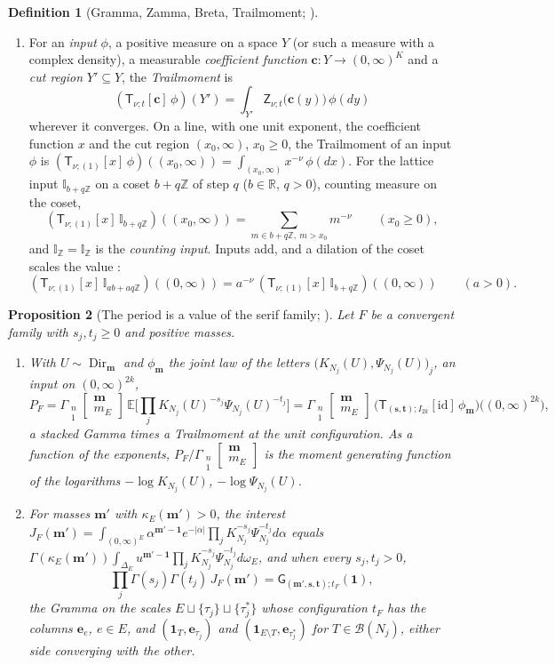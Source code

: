 \documentclass[11pt]{article}
\theoremstyle{plain}
\newtheorem{prop}{Proposition}[section]
\theoremstyle{definition}
\newtheorem{defn}[prop]{Definition}
\theoremstyle{remark}
\newcommand{\cB}{\mathcal B}
\newcommand{\R}{\mathbb R}
\newcommand{\Z}{\mathbb Z}
\newcommand{\bm}{\mathbf m}
\newcommand{\sG}{\mathsf G}
\newcommand{\sZ}{\mathsf Z}
\newcommand{\sT}{\mathsf T}
\newcommand{\Gst}[4]{\Gamma_{\substack{#1\\#2}}\!\begin{bmatrix}#3\\#4\end{bmatrix}}
\newcommand{\IZ}{\mathbb I_{\mathbb Z}}
\newcommand{\Ilat}[1]{\mathbb I_{#1}}
\newcommand{\Tx}[3]{(\sT_{#1;(1)}[x]\,#2)((#3,\infty))}
\DeclareMathOperator{\Dir}{Dir}
\begin{document}
\begin{defn}[Gramma, Zamma, Breta, Trailmoment; {\cite[Defs.~2.1, 2.12, 3.1, 5.1, 5.2, pp.~13--28]{F}}]
\begin{enumerate}[label=(\roman*)]
\[\]
\item For an \emph{input} $\phi$, a positive measure on a space $Y$ (or such a measure with a complex density), a measurable \emph{coefficient function} $\mathbf c:Y\to(0,\infty)^K$ and a \emph{cut region} $Y'\subseteq Y$, the \emph{Trailmoment} is
\[
(\sT_{\nu;t}[\mathbf c]\,\phi)(Y')=\int_{Y'}\sZ_{\nu;t}\big(\mathbf c(y)\big)\,\phi(dy)
\]
wherever it converges. On a line, with one unit exponent, the coefficient function $x$ and the cut region $(x_0,\infty)$, $x_0\ge0$, the Trailmoment of an input $\phi$ is $\Tx{\nu}{\phi}{x_0}=\int_{(x_0,\infty)}x^{-\nu}\,\phi(dx)$. For the lattice input $\Ilat{b+q\Z}$ on a coset $b+q\Z$ of step $q$ ($b\in\R$, $q>0$), counting measure on the coset,
\[
\Tx{\nu}{\Ilat{b+q\Z}}{x_0}=\sum_{m\in b+q\Z,\ m>x_0}m^{-\nu}\qquad(x_0\ge0),
\]
and $\IZ=\Ilat{\Z}$ is the \emph{counting input}. Inputs add, and a dilation of the coset scales the value \cite[Thm.~5.9, p.~31]{F}:
\[
\Tx{\nu}{\Ilat{ab+aq\Z}}{0}=a^{-\nu}\,\Tx{\nu}{\Ilat{b+q\Z}}{0}\qquad(a>0).
\]
\end{enumerate}
\end{defn}

\begin{prop}[The period is a value of the serif family; {\cite[Thm.~8.3, p.~54; Thm.~8.10, Prop.~8.11, p.~56]{F}}]\label{prop:serifvalue}
Let $F$ be a convergent family with $s_j,t_j\ge0$ and positive masses.
\begin{enumerate}[label=(\roman*)]
\item With $U\sim\Dir_{\bm}$ and $\phi_{\bm}$ the joint law of the letters $\big(K_{N_j}(U),\Psi_{N_j}(U)\big)_j$, an input on $(0,\infty)^{2k}$,
\[
P_F=\Gst{n}1{\bm}{m_E}\,\mathbb E\Big[\prod_jK_{N_j}(U)^{-s_j}\Psi_{N_j}(U)^{-t_j}\Big]=\Gst{n}1{\bm}{m_E}\,\big(\sT_{(\mathbf s,\mathbf t);I_{2k}}[\mathrm{id}]\,\phi_{\bm}\big)\big((0,\infty)^{2k}\big),
\]
a stacked Gamma times a Trailmoment at the unit configuration. As a function of the exponents, $P_F/\Gst{n}1{\bm}{m_E}$ is the moment generating function of the logarithms $-\log K_{N_j}(U)$, $-\log\Psi_{N_j}(U)$.
\item For masses $\bm'$ with $\kappa_E(\bm')>0$, the \emph{interest} $J_F(\bm')=\int_{(0,\infty)^E}\alpha^{\bm'-\mathbf 1}e^{-|\alpha|}\prod_jK_{N_j}^{-s_j}\Psi_{N_j}^{-t_j}d\alpha$ equals $\Gamma(\kappa_E(\bm'))\int_{\Delta_E}u^{\bm'-\mathbf 1}\prod_jK_{N_j}^{-s_j}\Psi_{N_j}^{-t_j}d\omega_E$, and when every $s_j,t_j>0$,
\[
\prod_j\Gamma(s_j)\Gamma(t_j)\,J_F(\bm')=\sG_{(\bm',\mathbf s,\mathbf t);t_F}(\mathbf 1),
\]
the Gramma on the scales $E\sqcup\{\tau_j\}\sqcup\{\tau^\ast_j\}$ whose configuration $t_F$ has the columns $\mathbf e_e$, $e\in E$, and $(\mathbf 1_T,\mathbf e_{\tau_j})$ and $(\mathbf 1_{E\setminus T},\mathbf e_{\tau^\ast_j})$ for $T\in\cB(N_j)$, either side converging with the other.
\end{enumerate}
\end{prop}
\end{document}
